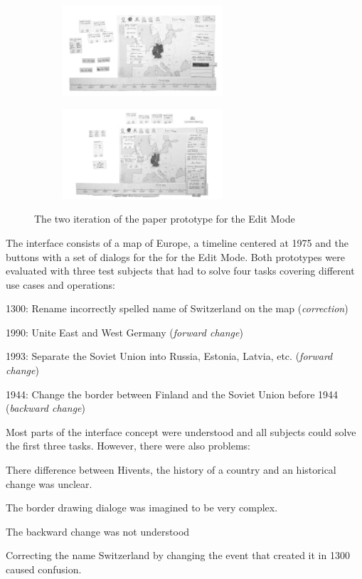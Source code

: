 \begin{figure}[H]
\centering
\begin{subfigure}{.5\textwidth}
  \centering
  \includegraphics[width=225px]{graphics/development/design_process/paper_prototype_1.png}
\end{subfigure}%
\begin{subfigure}{.5\textwidth}
  \centering
  \includegraphics[width=225px]{graphics/development/design_process/paper_prototype_2.png}
\end{subfigure}
\caption{The two iteration of the paper prototype for the Edit Mode}
\label{fig:paper_prototypes}
\end{figure}

The interface consists of a map of Europe, a timeline centered at 1975 and the buttons with a set of dialogs for the for the Edit Mode. Both prototypes were evaluated with three test subjects that had to solve four tasks covering different use cases and operations:
\begin{compactenum}
  \item 1300: Rename incorrectly spelled name of Switzerland on the map (\emph{correction})
  \item 1990: Unite East and West Germany (\emph{forward change})
  \item 1993: Separate the Soviet Union into Russia, Estonia, Latvia, etc. (\emph{forward change})
  \item 1944: Change the border between Finland and the Soviet Union before 1944 (\emph{backward change})
\end{compactenum}

Most parts of the interface concept were understood and all subjects could solve the first three tasks. However, there were also problems:

\begin{compactenum}
  \item There difference between Hivents, the history of a country and an historical change was unclear.
  \item The border drawing dialoge was imagined to be very complex.
  \item The backward change was not understood
  \item Correcting the name Switzerland by changing the event that created it in 1300 caused confusion.
\end{compactenum}

